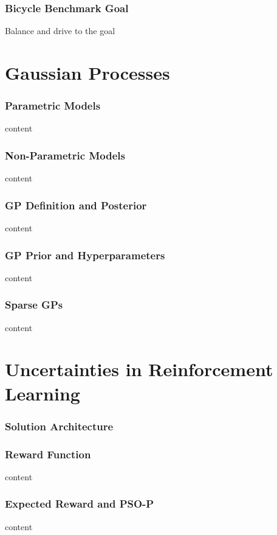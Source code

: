 \begin{frame}
    \frametitle{Bicycle Benchmark Goal}

    Balance and drive to the goal
\end{frame}

\section{Gaussian Processes}
\begin{frame}
    \frametitle{Parametric Models}

    content
\end{frame}

\begin{frame}
    \frametitle{Non-Parametric Models}

    content
\end{frame}

\begin{frame}
    \frametitle{GP Definition and Posterior}

    content
\end{frame}

\begin{frame}
    \frametitle{GP Prior and Hyperparameters}

    content
\end{frame}

\begin{frame}
    \frametitle{Sparse GPs}

    content
\end{frame}

\section{Uncertainties in Reinforcement Learning}
\begin{frame}
    \frametitle{Solution Architecture}

    \centering
    
\end{frame}

\begin{frame}
    \frametitle{Reward Function}

    content
\end{frame}

\begin{frame}
    \frametitle{Expected Reward and PSO-P}

    content
\end{frame}


